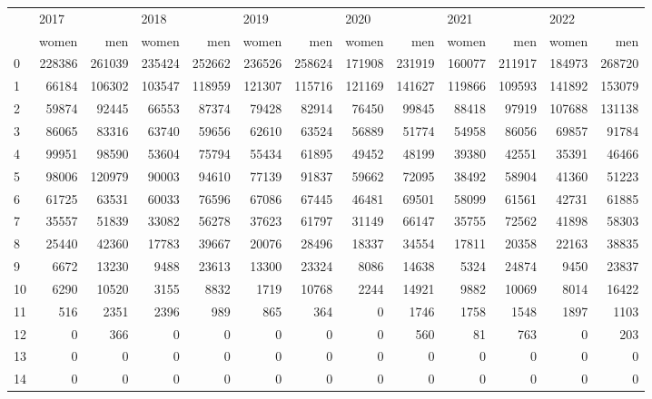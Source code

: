 \begin{tabular}{lrrrrrrrrrrrr}
\toprule
{} & \multicolumn{2}{l}{2017} & \multicolumn{2}{l}{2018} & \multicolumn{2}{l}{2019} & \multicolumn{2}{l}{2020} & \multicolumn{2}{l}{2021} & \multicolumn{2}{l}{2022} \\
{} &   women &     men &   women &     men &   women &     men &   women &     men &   women &     men &   women &     men \\
\midrule
0  &  228386 &  261039 &  235424 &  252662 &  236526 &  258624 &  171908 &  231919 &  160077 &  211917 &  184973 &  268720 \\
1  &   66184 &  106302 &  103547 &  118959 &  121307 &  115716 &  121169 &  141627 &  119866 &  109593 &  141892 &  153079 \\
2  &   59874 &   92445 &   66553 &   87374 &   79428 &   82914 &   76450 &   99845 &   88418 &   97919 &  107688 &  131138 \\
3  &   86065 &   83316 &   63740 &   59656 &   62610 &   63524 &   56889 &   51774 &   54958 &   86056 &   69857 &   91784 \\
4  &   99951 &   98590 &   53604 &   75794 &   55434 &   61895 &   49452 &   48199 &   39380 &   42551 &   35391 &   46466 \\
5  &   98006 &  120979 &   90003 &   94610 &   77139 &   91837 &   59662 &   72095 &   38492 &   58904 &   41360 &   51223 \\
6  &   61725 &   63531 &   60033 &   76596 &   67086 &   67445 &   46481 &   69501 &   58099 &   61561 &   42731 &   61885 \\
7  &   35557 &   51839 &   33082 &   56278 &   37623 &   61797 &   31149 &   66147 &   35755 &   72562 &   41898 &   58303 \\
8  &   25440 &   42360 &   17783 &   39667 &   20076 &   28496 &   18337 &   34554 &   17811 &   20358 &   22163 &   38835 \\
9  &    6672 &   13230 &    9488 &   23613 &   13300 &   23324 &    8086 &   14638 &    5324 &   24874 &    9450 &   23837 \\
10 &    6290 &   10520 &    3155 &    8832 &    1719 &   10768 &    2244 &   14921 &    9882 &   10069 &    8014 &   16422 \\
11 &     516 &    2351 &    2396 &     989 &     865 &     364 &       0 &    1746 &    1758 &    1548 &    1897 &    1103 \\
12 &       0 &     366 &       0 &       0 &       0 &       0 &       0 &     560 &      81 &     763 &       0 &     203 \\
13 &       0 &       0 &       0 &       0 &       0 &       0 &       0 &       0 &       0 &       0 &       0 &       0 \\
14 &       0 &       0 &       0 &       0 &       0 &       0 &       0 &       0 &       0 &       0 &       0 &       0 \\
\bottomrule
\end{tabular}
